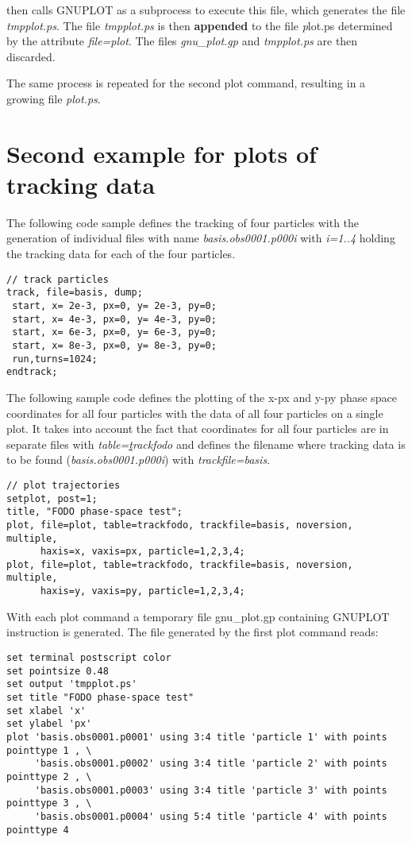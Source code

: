 \madx then calls GNUPLOT as a subprocess to execute this file, which
generates the file \textit{tmpplot.ps}.  
The file \textit{tmpplot.ps} is then {\bf appended} to the file 
{\textit plot.ps} determined by the attribute \textit{file=plot}.  
The files \textit{gnu\_plot.gp} and \textit{tmpplot.ps} are then
discarded. 

The same process is repeated for the second plot command, resulting in a
growing file \textit{plot.ps}.


\section{Second example for plots of tracking data}
\label{sec:plot_example_2}

The following \madx code sample defines the tracking of four particles 
with the generation of individual files with name
\textit{basis.obs0001.p000i} with \textit{i=1..4}  
holding the tracking data for each of the four particles.  

\begin{verbatim}
// track particles
track, file=basis, dump;
 start, x= 2e-3, px=0, y= 2e-3, py=0;
 start, x= 4e-3, px=0, y= 4e-3, py=0;
 start, x= 6e-3, px=0, y= 6e-3, py=0;
 start, x= 8e-3, px=0, y= 8e-3, py=0;
 run,turns=1024;
endtrack;
\end{verbatim}

The following sample code defines the plotting of the x-px and y-py
phase space coordinates for all four particles with the data of all four
particles on a single plot.  
It takes into account the fact that coordinates for all four particles
are in separate files with 
\textit{table={\underline track}fodo} and defines the filename where tracking
data is to be found (\textit{basis.obs0001.p000i}) with
\textit{trackfile=basis}.  

\begin{verbatim}
// plot trajectories
setplot, post=1; 
title, "FODO phase-space test";
plot, file=plot, table=trackfodo, trackfile=basis, noversion, multiple, 
      haxis=x, vaxis=px, particle=1,2,3,4; 
plot, file=plot, table=trackfodo, trackfile=basis, noversion, multiple, 
      haxis=y, vaxis=py, particle=1,2,3,4;  
\end{verbatim}

With each plot command a temporary file gnu\_plot.gp containing GNUPLOT instruction is generated. 
The file generated by the first plot command reads: 

{\footnotesize \begin{verbatim}
set terminal postscript color
set pointsize 0.48
set output 'tmpplot.ps'
set title "FODO phase-space test"
set xlabel 'x'
set ylabel 'px'
plot 'basis.obs0001.p0001' using 3:4 title 'particle 1' with points pointtype 1 , \
     'basis.obs0001.p0002' using 3:4 title 'particle 2' with points pointtype 2 , \
     'basis.obs0001.p0003' using 3:4 title 'particle 3' with points pointtype 3 , \
     'basis.obs0001.p0004' using 5:4 title 'particle 4' with points pointtype 4 
\end{verbatim}}

